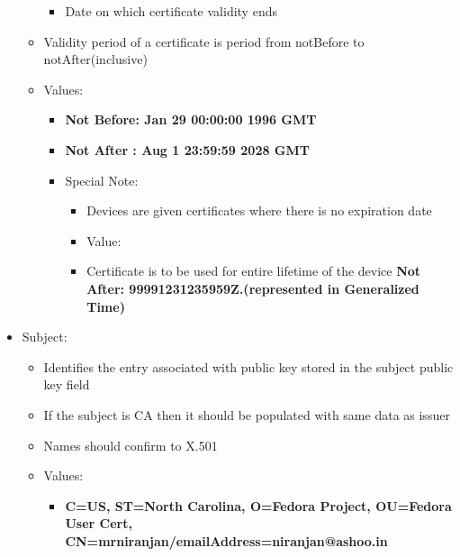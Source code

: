\documentclass[12pt]{report}
\begin{document}
\begin{itemize}
\begin{itemize}
\begin{itemize}
                            \item Date on which certificate validity ends
                        \end{itemize}
                    \item Validity period of a certificate is period from notBefore to notAfter(inclusive)
                    \item Values:
                        \begin{itemize}
                            \item \textbf{Not Before: Jan 29 00:00:00 1996 GMT}
                            \item \textbf{Not After : Aug  1 23:59:59 2028 GMT}
                            \item Special Note:
                                \begin{itemize}
                                    \item Devices are given certificates where there is no expiration date
                                    \item Value:
                                    \item Certificate is to be used for entire lifetime of the device \textbf{ Not After: 99991231235959Z.(represented in Generalized Time)}
                                \end{itemize}
                        \end{itemize}
                    \end{itemize}
            \item Subject:
                \begin{itemize}
                    \item Identifies the entry associated with public key stored in the subject public key field 
                    \item If the subject is CA then it should be populated with same data as issuer 
                    \item Names should confirm to X.501
                    \item Values:
                        \begin{itemize}
                            \item \textbf{C=US, ST=North Carolina, O=Fedora Project, OU=Fedora User Cert, CN=mrniranjan/emailAddress=niranjan@ashoo.in}
                        \end{itemize}
                \end{itemize}

\end{itemize}
\end{document}
